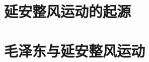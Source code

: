 \documentclass{GaoHua}
\begin{document}
\frontmatter


\tableofcontents

\mainmatter

\part{延安整风运动的起源}


\part{毛泽东与延安整风运动}


\backmatter

\end{document}
